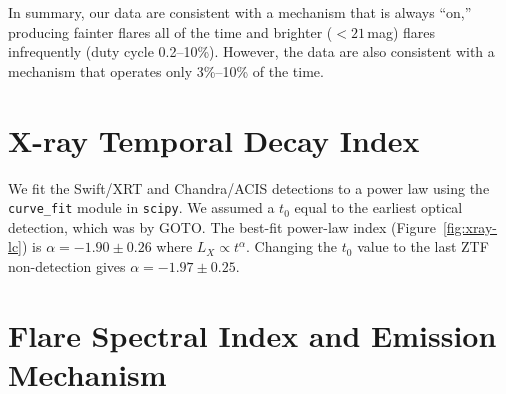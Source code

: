 \documentclass{nature_plusfigure}
\begin{document}
\begin{methods}
In summary, our data are consistent with a mechanism that is always ``on,'' producing fainter flares all of the time and brighter ($<21\,$mag) flares infrequently (duty cycle 0.2--10\%). However, the data are also consistent with a mechanism that operates only 3\%--10\% of the time. 


\section{X-ray Temporal Decay Index}
\label{sec:xray-decay-index}

We fit the Swift/XRT and Chandra/ACIS detections to a power law using the \texttt{curve\_fit} module in \texttt{scipy}. We assumed a $t_0$ equal to the earliest optical detection, which was by GOTO\cite{Coppejans2022}. The best-fit power-law index (Figure~\ref{fig:xray-lc}) is $\alpha=-1.90\pm0.26$ where $L_X \propto t^{\alpha}$.
Changing the $t_0$ value to the last ZTF non-detection gives $\alpha=-1.97\pm0.25$.



\section{Flare Spectral Index and Emission Mechanism}
\label{sec:flare-emission-mechanism}


\end{methods}
\end{document}
